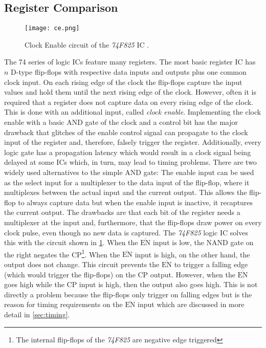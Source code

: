 \subsection{Register Comparison}
\begin{figure}[t]
  \centering
  \texttt{[image: ce.png]}
  \caption{Clock Enable circuit of the \emph{74F825} \gls{IC} \cite{74f825}.}
  \label{fig:clockEnable}
\end{figure}
The 74 series of logic \glspl{IC} feature many registers.
The most basic register \gls{IC} has $n$ D-type flip-flops with respective data inputs and outputs plus one common clock input.
On each rising edge of the clock the flip-flops capture the input values and hold them until the next rising edge of the clock.
However, often it is required that a register does not capture data on every rising edge of the clock.
This is done with an additional input, called \emph{clock enable}.
Implementing the clock enable with a basic AND gate of the clock and a control bit has the major drawback that glitches of the enable control signal can propagate to the clock input of the register and, therefore, falsely trigger the register.
Additionally, every logic gate has a propagation latency which would result in a clock signal being delayed at some \glspl{IC} which, in turn, may lead to timing problems.
There are two widely used alternatives to the simple AND gate:
The enable input can be used as the select input for a multiplexer to the data input of the flip-flop, where it multiplexes between the actual input and the current output.
This allows the flip-flop to always capture data but when the enable input is inactive, it recaptures the current output.
The drawbacks are that each bit of the register needs a multiplexer at the input and, furthermore, that the flip-flops draw power on every clock pulse, even though no new data is captured.
The \emph{74F825} logic \gls{IC} solves this with the circuit shown in \cref{fig:clockEnable}.
When the $\overline{\text{EN}}$ input is low, the NAND gate on the right negates the CP\footnote{The internal flip-flops of the \emph{74F825} are negative edge triggered}.
When the $\overline{\text{EN}}$ input is high, on the other hand, the output does not change.
This circuit prevents the $\overline{\text{EN}}$ to trigger a falling edge (which would trigger the flip-flops) on the CP output.
However, when the $\overline{\text{EN}}$ goes high while the CP input is high, then the output also goes high.
This is not directly a problem because the flip-flops only trigger on falling edges but is the reason for timing requirements on the $\overline{\text{EN}}$ input which are discussed in more detail in \cref{sec:timing}.
